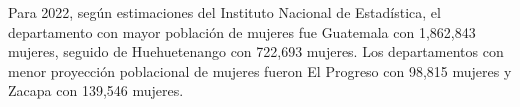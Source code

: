 Para 2022, según estimaciones del Instituto Nacional de Estadística, el departamento con mayor población de mujeres fue Guatemala con 1,862,843 mujeres, seguido de Huehuetenango con 722,693 mujeres. Los departamentos con menor proyección poblacional de mujeres fueron El Progreso con 98,815 mujeres y Zacapa con 139,546 mujeres. 